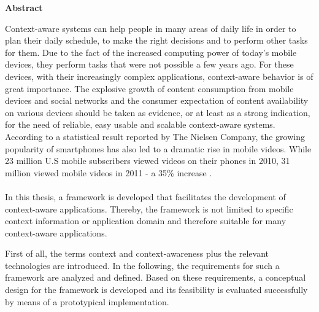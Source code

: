 \thispagestyle{empty}
\vspace*{1.0cm}

\begin{center}
    \textbf{Abstract}
\end{center}

\vspace*{0.5cm}

\noindent
Context-aware systems can help people in many areas of daily life in order to plan their daily schedule, to make the right decisions  and to perform other tasks for them.
Due to the fact of the increased computing power of today's mobile devices, they perform tasks that were not possible a few years ago. For these devices, with their increasingly complex applications, context-aware behavior is of great importance. The explosive growth of content consumption from mobile devices and social networks and the consumer expectation of content availability on various devices should be taken as evidence, or at least as a strong indication, for the need of reliable, easy usable and scalable context-aware systems.%
According to a statistical result reported by The Nielsen Company, the growing popularity of smartphones has also led to a dramatic rise in mobile videos. While 23 million U.S mobile subscribers viewed videos on their phones in 2010, 31 million viewed mobile videos in 2011 - a 35\% increase \cite{mobile-media-report}. 
\\
\\
In this thesis, a framework is developed that facilitates the development of context-aware applications. Thereby, the framework is not limited to specific context information or application domain and therefore suitable for many context-aware applications.

First of all, the terms context and context-awareness plus the relevant technologies are introduced. In the following, the requirements for such a framework are analyzed and defined. Based on these requirements, a conceptual design for the framework is developed and its feasibility is evaluated successfully by means of a prototypical implementation.

